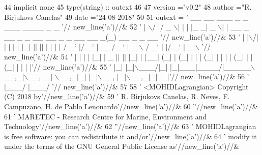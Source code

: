 \begin{DoxyCode}
44     \textcolor{keywordtype}{implicit none}
45     \textcolor{keywordtype}{type}(string) :: outext
46 
47     version  =\textcolor{stringliteral}{"v0.2"}
48     author   =\textcolor{stringliteral}{"R. Birjukovs Canelas"}
49     date     =\textcolor{stringliteral}{"24-08-2018"}
50 
51     outext = \textcolor{stringliteral}{' \_\_  \_\_  \_\_\_  \_   \_ \_\_\_ \_\_\_\_  \_                                      \_              '}//
      new\_line(\textcolor{stringliteral}{'a'})//&
52              \textcolor{stringliteral}{' |  \(\backslash\)/  |/ \_ \(\backslash\)| | | |\_ \_|  \_ \(\backslash\)| |    \_\_ \_  \_\_ \_ \_ \_\_ \_\_ \_ \_ \_\_   \_\_ \_(\_) \_\_ \_ \_ \_\_  '}//
      new\_line(\textcolor{stringliteral}{'a'})//&
53              \textcolor{stringliteral}{' | |\(\backslash\)/| | | | | |\_| || || | | | |   / \_` |/ \_` | \_\_/  \_` |  \_ \(\backslash\) / \_` | |/ \_` |  \_ \(\backslash\) '}//
      new\_line(\textcolor{stringliteral}{'a'})//&
54              \textcolor{stringliteral}{' | |  | | |\_| |  \_  || || |\_| | |\_\_| (\_| | (\_| | | | (\_| | | | | (\_| | | (\_| | | | |'}//
      new\_line(\textcolor{stringliteral}{'a'})//&
55              \textcolor{stringliteral}{' |\_|  |\_|\(\backslash\)\_\_\_/|\_| |\_|\_\_\_|\_\_\_\_/|\_\_\_\_\_\(\backslash\)\_\_,\_|\(\backslash\)\_\_, |\_|  \(\backslash\)\_\_,\_|\_| |\_|\(\backslash\)\_\_, |\_|\(\backslash\)\_\_,\_|\_| |\_|'}//
      new\_line(\textcolor{stringliteral}{'a'})//&
56              \textcolor{stringliteral}{'                                          |\_\_\_/                 |\_\_\_/               '}//
      new\_line(\textcolor{stringliteral}{'a'})//&
57 
58         \textcolor{stringliteral}{'  <MOHIDLagrangian> Copyright (C) 2018 by'}//new\_line(\textcolor{stringliteral}{'a'})//&
59         \textcolor{stringliteral}{'  R. Birjukovs Canelas, R. Neves, F. Campuzano, H. de Pablo Lenonardo'}//new\_line(\textcolor{stringliteral}{'a'})//&
60         \textcolor{stringliteral}{''}//new\_line(\textcolor{stringliteral}{'a'})//&
61         \textcolor{stringliteral}{'  MARETEC - Research Centre for Marine, Environment and Technology'}//new\_line(\textcolor{stringliteral}{'a'})//&
62         \textcolor{stringliteral}{''}//new\_line(\textcolor{stringliteral}{'a'})//&
63         \textcolor{stringliteral}{'  MOHIDLagrangian is free software: you can redistribute it and/or'}//new\_line(\textcolor{stringliteral}{'a'})//&
64         \textcolor{stringliteral}{'  modify it under the terms of the GNU General Public License as'}//new\_line(\textcolor{stringliteral}{'a'})//&

\end{DoxyCode}
